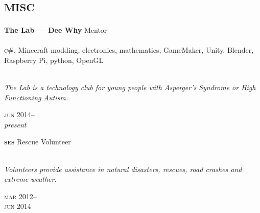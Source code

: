 

\section*{\textsc{misc}}
\vspace{-0.2cm}

\begin{minipage}[t]{0.75\textwidth}
\textbf{The Lab --- Dee Why}\phantom{..} Mentor \\
\\
\textsc{c\#}, Minecraft modding, electronics, mathematics, GameMaker, 
Unity, Blender, Raspberry Pi, python, OpenGL
\\
\\
{\small
\textit{The Lab is a technology club for young people with Asperger’s Syndrome or High Functioning Autism.}
\par}
\end{minipage}
\begin{minipage}[t]{0.25\textwidth}
{
\hfill \textsc{jun} 2014--\\ 
\hspace*{0pt} \hfill \textit{present}
\par
}
\end{minipage}

\vspace{0.2in}

\begin{minipage}[t]{0.75\textwidth}
\textbf{\textsc{ses}}\phantom{..} Rescue Volunteer\\
\\
{\small
\textit{Volunteers provide assistance in natural disasters, rescues, road crashes and extreme weather.}
\par}
\end{minipage}
\begin{minipage}[t]{0.25\textwidth}
{
\hfill \textsc{mar} 2012--\\ 
\hspace*{0pt} \hfill \textsc{jun} 2014
\par
}
\end{minipage}

\vspace{0.2in}

